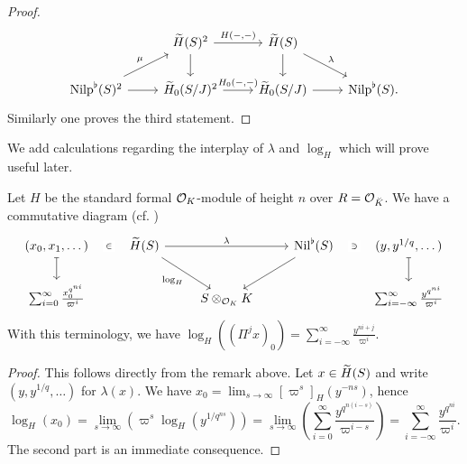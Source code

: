 \documentclass[../main.tex]{subfiles}
\begin{document}
\begin{lem}
\begin{proof}
  \begin{equation*}
    \begin{tikzcd}[ampersand replacement=\&]
    	\& {\Tilde H(S)^2} \& {\Tilde H(S)} \\
    	{\Nilp^\flat(S)^2} \& {\Tilde H_0(S/J)^2} \& {\Tilde H_0(S/J)} \& {\Nilp^\flat(S).}
    	\arrow["{H(-,-)}", from=1-2, to=1-3]
    	\arrow[ from=1-2, to=2-2]
    	\arrow[ from=1-3, to=2-3]
    	\arrow["\lambda", from=1-3, to=2-4]
    	\arrow["\mu", from=2-1, to=1-2]
    	\arrow[ from=2-1, to=2-2]
    	\arrow["{H_0(-,-)}", from=2-2, to=2-3]
    	\arrow[from=2-3, to=2-4]
    \end{tikzcd}
  \end{equation*}
  Similarly one proves the third statement.
\end{proof}
\end{lem}

We add calculations regarding the interplay of $\lambda$ and $\log_H$ which will prove
useful later.
\begin{lem}\label{lem:LogInTermsOfNil}
  Let $H$ be the standard formal $\cO_K$-module of height $n$ over $R =
  \cO_{\breve K}$. We have a commutative diagram (cf. \cite[Lemma
  2.6.1]{BoyarchenkoWeinstein2011MaxVar})
  \begin{equation*}
  \begin{tikzcd}[ampersand replacement=\&]
  	{(x_0, x_1, \dots)} \& {\Tilde H(S)} \&\& {\Nil^\flat(S)} \& {(y,y^{1/q}, \dots)} \\
  	{\sum_{i=0}^\infty \frac{x_0^{q^{ni}}}{\varpi^i}} \&\& {S\otimes_{\cO_K}K} \&\& {\sum_{i = -\infty}^\infty\frac{y^{q^{ni}}}{\varpi^i}}
  	\arrow["\in"{description}, draw=none, from=1-1, to=1-2]
  	\arrow[maps to, from=1-1, to=2-1]
  	\arrow["\lambda", from=1-2, to=1-4]
  	\arrow["{\log_H}"', from=1-2, to=2-3]
  	\arrow[from=1-4, to=2-3]
  	\arrow["\ni"{description}, draw=none, from=1-5, to=1-4]
  	\arrow[maps to, from=1-5, to=2-5]
  \end{tikzcd}
  \end{equation*}
  With this terminology, we have $\log_H((\Pi^j x)_0) = \sum_{i = -\infty}^\infty
  \frac{ y^{ni + j}}{\varpi^i}$. 
\begin{proof}
  This follows directly from the remark above. Let $x \in \Tilde H(S)$ and write
  $(y, y^{1/q}, \dots)$ for $\lambda(x)$. We have $x_0 = \lim_{s \to \infty}
  [\varpi^s]_H(y^{-ns})$, hence
  \begin{equation*}
    \log_H(x_0) = \lim_{s \to \infty}\left( \varpi^s \log_H(y^{1/q^{ns}})\right) = 
    \lim_{s \to \infty}\left( \sum_{i=0}^\infty  \frac{y^{q^{n(i-s)}}}{\varpi^{i-s}}\right)
    = \sum_{i=-\infty}^\infty \frac{y^{q^{ni}}}{\varpi^i}.
  \end{equation*}
  The second part is an immediate consequence.
\end{proof}
\end{lem}
\end{document}
